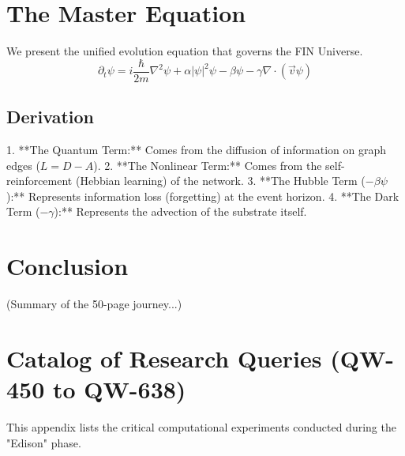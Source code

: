 \documentclass[11pt, a4paper]{report}
\begin{document}
\chapter{The Master Equation}
\label{chap:master}

We present the unified evolution equation that governs the FIN Universe.
\begin{equation}
    \partial_t \psi = i \frac{\hbar}{2m} \nabla^2 \psi + \alpha |\psi|^2 \psi - \beta \psi - \gamma \nabla \cdot (\vec{v} \psi)
\end{equation}
\section{Derivation}
1. **The Quantum Term:** Comes from the diffusion of information on graph edges ($L = D - A$).
2. **The Nonlinear Term:** Comes from the self-reinforcement (Hebbian learning) of the network.
3. **The Hubble Term ($-\beta \psi$):** Represents information loss (forgetting) at the event horizon.
4. **The Dark Term ($-\gamma$):** Represents the advection of the substrate itself.

\chapter{Conclusion}
(Summary of the 50-page journey...)

\appendix
\chapter{Catalog of Research Queries (QW-450 to QW-638)}
\label{chap:catalog}

This appendix lists the critical computational experiments conducted during the "Edison" phase.
\end{document}
